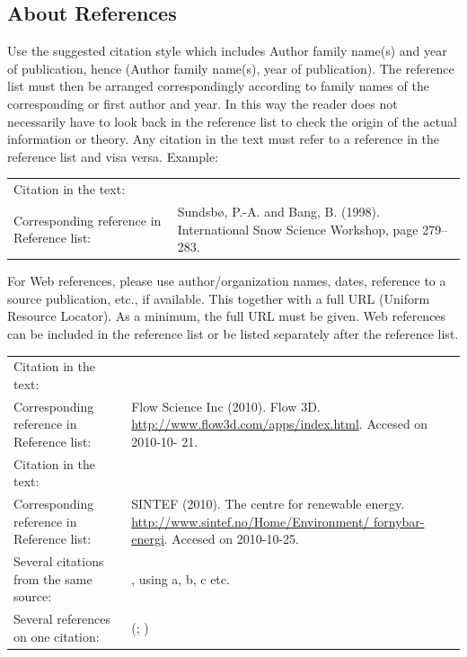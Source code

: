 \documentclass[a4paper,11pt]{extarticle}
\begin{document}
\subsection{About References}
Use the suggested citation style which includes Author family name(s) and year of publication, hence (Author family name(s), year of publication). The reference list must then be arranged correspondingly according to family names of the corresponding or first author and year. In this way the reader does not necessarily have to look back in the reference list to check the origin of the actual information or theory. Any citation in the text must refer to a reference in the reference list and visa versa. Example:

\begin{table}[H]
  \footnotesize
  \begin{tabulary}{\textwidth}{lL}
    Citation in the text: & \citep{Sundsbo1998}\\
    Corresponding reference in Reference list: & Sundsbø, P.-A. and Bang, B. (1998). International Snow Science Workshop, page 279–283.
  \end{tabulary}
\end{table}

For Web references, please use author/organization names, dates, reference to a source publication, etc., if available. This together with a full URL (Uniform Resource Locator). As a minimum, the full URL must be given. Web references can be included in the reference list or be listed separately after the reference list.
\begin{table}[H]
  \footnotesize
  \begin{tabulary}{\textwidth}{lL}
    Citation in the text: & \citep{FlowScienceInc2010} \\
    Corresponding reference in Reference list: & Flow Science Inc (2010). Flow 3D. \url{http://www.flow3d.com/apps/index.html}. Accesed on 2010-10-
    21. \\
    Citation in the text: & \citep{SINTEF2010}\\
    Corresponding reference in Reference list: & SINTEF (2010). The centre for renewable energy. \url{http://www.sintef.no/Home/Environment/
    fornybar-energi}. Accesed on 2010-10-25.\\
    Several citations from the same source: & \citep[a]{SINTEF2010}, using a, b, c etc.\\
    Several references on one citation: & (\citep{SINTEF2010}; \citep{FlowScienceInc2010})
  \end{tabulary}
\end{table}
\end{document}
